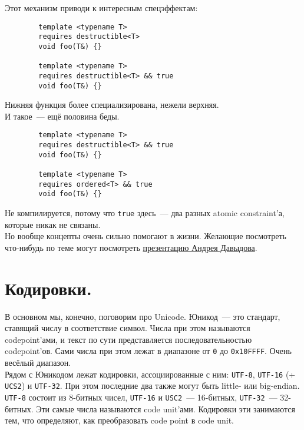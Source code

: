 \documentclass{article}
\begin{document}
    Этот механизм приводи к интересным спецэффектам:
    \begin{verbatim}
        template <typename T>
        requires destructible<T>
        void foo(T&) {}

        template <typename T>
        requires destructible<T> && true
        void foo(T&) {}
    \end{verbatim}
    Нижняя функция более специализирована, нежели верхняя.\\
    И такое~--- ещё половина беды.
    \begin{verbatim}
        template <typename T>
        requires destructible<T> && true
        void foo(T&) {}
        
        template <typename T>
        requires ordered<T> && true
        void foo(T&) {}
    \end{verbatim}
    Не компилируется, потому что \texttt{true} здесь~--- два разных atomic constraint'а, которые никак не связаны.\\
    Но вообще концепты очень сильно помогают в жизни. Желающие посмотреть что-нибудь по теме могут посмотреть \href{youtube.com/watch?v=vYzjV0xSqJE}{презентацию Андрея Давыдова}.
    \section{Кодировки.}
    В основном мы, конечно, поговорим про Unicode. Юникод~--- это стандарт, ставящий числу в соответствие символ. Числа при этом называются codepoint'ами, и текст по сути представляется последовательностью codepoint'ов. Сами числа при этом лежат в диапазоне от \texttt{0} до \texttt{0x10FFFF}. Очень весёлый диапазон.\\
    Рядом с Юникодом лежат кодировки, ассоциированные с ним: \Verb|UTF-8|, \Verb|UTF-16| (+ \Verb|UCS2|) и \Verb|UTF-32|. При этом последние два также могут быть little- или big-endian. \Verb|UTF-8| состоит из 8-битных чисел, \Verb|UTF-16| и \Verb|USC2|~--- 16-битных, \Verb|UTF-32|~--- 32-битных. Эти самые числа называются code unit'ами. Кодировки эти занимаются тем, что определяют, как преобразовать code point в code unit.
\end{document}
